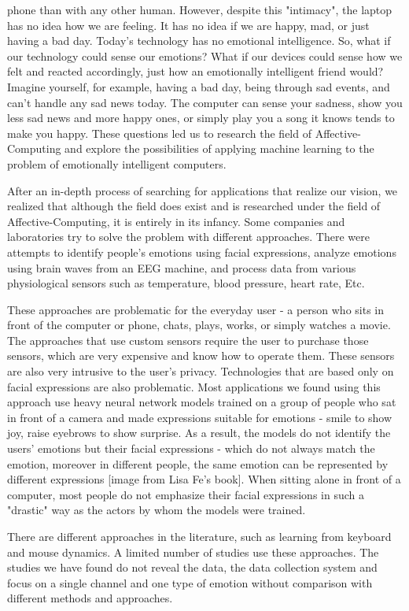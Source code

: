 
phone than with any other human. However, despite this "intimacy", the laptop has no idea how we are feeling. 
It has no idea if we are happy, mad, or just having a bad day. Today's technology has no emotional intelligence. 
So, what if our technology could sense our emotions? What if our devices could sense how we felt and reacted accordingly, 
just how an emotionally intelligent friend would?  Imagine yourself, for example, having a bad day, being through sad events,
and can't handle any sad news today. The computer can sense your sadness, show you less sad news and more happy ones, 
or simply play you a song it knows tends to make you happy.
These questions led us to research the field of Affective-Computing and explore the possibilities of applying machine learning to the problem of 
emotionally intelligent computers.

After an in-depth process of searching for applications that realize our vision, 
we realized that although the field does exist and is researched under the field of Affective-Computing, 
it is entirely in its infancy. Some companies and laboratories try to solve the problem with different approaches. 
There were attempts to identify people's emotions using facial expressions, analyze emotions using brain waves from an EEG machine, 
and process data from various physiological sensors such as temperature, blood pressure, heart rate, Etc.

These approaches are problematic for the everyday user - a person who sits in front of the computer or phone, chats, 
plays, works, or simply watches a movie. The approaches that use custom sensors require the user to purchase those sensors, 
which are very expensive and know how to operate them. These sensors are also very intrusive to the user's privacy. 
Technologies that are based only on facial expressions are also problematic. Most applications we found using this approach use heavy neural network
models trained on a group of people who sat in front of a camera and made expressions suitable for emotions - smile to show joy, raise eyebrows to show surprise.
As a result, the models do not identify the users' emotions but their facial expressions - which do not always match the emotion, moreover in different people, 
the same emotion can be represented by different expressions [image from Lisa Fe's book]. 
When sitting alone in front of a computer, most people do not emphasize their facial expressions in such a "drastic" way as the actors by whom the 
models were trained.

There are different approaches in the literature, such as learning from keyboard and mouse dynamics. 
A limited number of studies use these approaches. The studies we have found do not reveal the data, 
the data collection system and focus on a single channel and one type of emotion without comparison with different methods and approaches.

